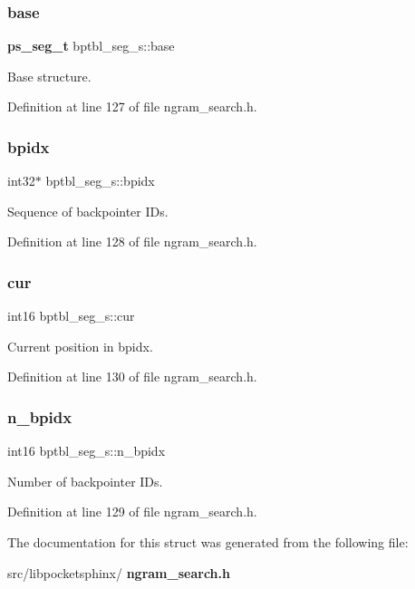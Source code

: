 \subsubsection{base}
{\footnotesize\ttfamily \textbf{ ps\+\_\+seg\+\_\+t} bptbl\+\_\+seg\+\_\+s\+::base}



Base structure. 



Definition at line 127 of file ngram\+\_\+search.\+h.

\mbox{\label{structbptbl__seg__s_a81e3d422fb2307c1a83e9490525dce7f}} 
\subsubsection{bpidx}
{\footnotesize\ttfamily int32$\ast$ bptbl\+\_\+seg\+\_\+s\+::bpidx}



Sequence of backpointer I\+Ds. 



Definition at line 128 of file ngram\+\_\+search.\+h.

\mbox{\label{structbptbl__seg__s_a1649196a2c03fb61b31624086ee998b5}} 
\subsubsection{cur}
{\footnotesize\ttfamily int16 bptbl\+\_\+seg\+\_\+s\+::cur}



Current position in bpidx. 



Definition at line 130 of file ngram\+\_\+search.\+h.

\mbox{\label{structbptbl__seg__s_a8d1f0aa7dd09e2d6321a00b68ab6a051}} 
\subsubsection{n\+\_\+bpidx}
{\footnotesize\ttfamily int16 bptbl\+\_\+seg\+\_\+s\+::n\+\_\+bpidx}



Number of backpointer I\+Ds. 



Definition at line 129 of file ngram\+\_\+search.\+h.



The documentation for this struct was generated from the following file\+:\begin{DoxyCompactItemize}
\item 
src/libpocketsphinx/\textbf{ ngram\+\_\+search.\+h}\end{DoxyCompactItemize}
